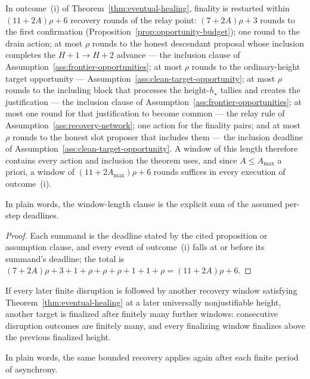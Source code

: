\begin{corollary}
\label{cor:end-to-end}
In outcome~(i) of Theorem~\ref{thm:eventual-healing}, finality is
restarted within \((11+2A)\rho+6\) recovery rounds of the relay
point: \((7+2A)\rho+3\) rounds to the first confirmation
(Proposition~\ref{prop:opportunity-budget}); one round to the drain
action; at most \(\rho\) rounds to the honest descendant proposal
whose inclusion completes the \(H+1\to H+2\) advance --- the
inclusion clause of Assumption~\ref{ass:frontier-opportunities}; at
most \(\rho\) rounds to the ordinary-height target opportunity ---
Assumption~\ref{ass:clean-target-opportunity}; at most \(\rho\)
rounds to the including block that processes the height-\(h_\star\)
tallies and creates the justification --- the inclusion clause of
Assumption~\ref{ass:frontier-opportunities}; at most one round for
that justification to become common --- the relay rule of
Assumption~\ref{ass:recovery-network}; one action for the finality
pairs; and at most \(\rho\) rounds to the honest slot proposer that
includes them --- the inclusion deadline of
Assumption~\ref{ass:clean-target-opportunity}.  A window of this
length therefore contains every action and inclusion the theorem uses,
and since \(A\leq A_{\max}\) a priori, a window of
\((11+2A_{\max})\rho+6\) rounds suffices in every execution of
outcome~(i).

In plain words, the window-length clause is the explicit sum of the
assumed per-step deadlines.
\end{corollary}

\begin{proof}
Each summand is the deadline stated by the cited proposition or
assumption clause, and every event of outcome~(i) falls at or before
its summand's deadline; the total is
\((7+2A)\rho+3+1+\rho+\rho+\rho+1+1+\rho=(11+2A)\rho+6\).
\end{proof}

\begin{corollary}
\label{cor:recurring-healing}
If every later finite disruption is followed by another recovery window
satisfying Theorem~\ref{thm:eventual-healing} at a later universally
nonjustifiable height, another target is finalized after finitely many
further windows: consecutive disruption outcomes are finitely many, and
every finalizing window finalizes above the previous finalized height.

In plain words, the same bounded recovery applies again after each finite
period of asynchrony.
\end{corollary}

